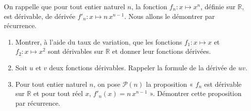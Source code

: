 \documentclass[11pt,fleqn]{book} %
\begin{document}
\begin{exercise}[topic=rec01]
On rappelle que pour tout entier naturel $n$, la fonction $f_n : x \mapsto x^n$, définie sur $\mathbb{R}$, est dérivable, de dérivée $f'_n : x \mapsto n\,x^{n-1}$. Nous allons le démontrer par récurrence.
\begin{enumerate}
\item Montrer, à l'aide du taux de variation, que les fonctions \(f_1 : x \mapsto x\) et \(f_2 : x \mapsto x^2\) sont dérivables sur \( \mathbb{R}\) et donner leur fonctions dérivées.
\item Soit $u$ et $v$ deux fonctions dérivables. Rappeler la formule de la dérivée de $uv$.
\item Pour tout entier naturel $n$, on pose $\mathcal{P}(n)$ la proposition « $f_n$ est dérivable sur $\mathbb{R}$ et pour tout réel $x$, $f'_n(x)=n\,x^{n-1}$ ». Démontrer cette proposition par récurrence.\end{enumerate}
\end{exercise}
\end{document}
